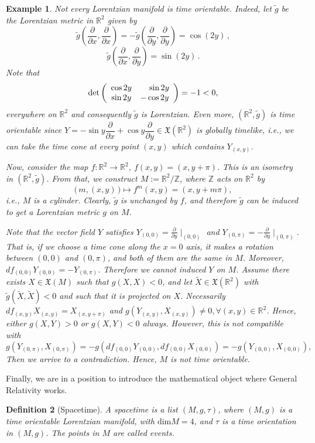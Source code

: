\documentclass[11pt]{book}
\newtheorem{defi}{Definition}[chapter]
\newtheorem{ex}[defi]{Example}
\def\R{\mathbb R}
\def\Z{\mathbb Z}
\def\x{\mathfrak X}
\begin{document}
\begin{ex}
	{\rm 
		Not every Lorentzian manifold is time orientable. 
		Indeed, let $\tilde{g}$ be the Lorentzian metric in $\R^2$ given by
		\[
		\tilde{g}\left(\frac{\partial}{\partial x}, \frac{\partial}{\partial x}\right)=-\tilde{g}\left(\frac{\partial}{\partial y}, \frac{\partial}{\partial y}\right)=\cos(2y)\,,
		\]
		\[
		\tilde{g}\left(\frac{\partial}{\partial x},\frac{\partial}{\partial y}\right)=\sin(2y)\,.
		\]
		Note that
		\[
		\mathrm{det}\left( \begin{array}{cc}
			\cos 2y & \hspace*{4mm}\sin 2y  \\
			\sin 2y & -\cos 2y
		\end{array} \right)=-1<0,
		\]
		everywhere on $\R^2$ and consequently $\tilde{g}$ is Lorentzian. Even more, $(\R^2,\tilde{g})$ is time orientable since $Y=-\sin y\dfrac{\partial}{\partial x} + \cos y \dfrac{\partial}{\partial y}\in \x(\R^2)$ is globally timelike, i.e., we can take the time cone at every point $(x,y)$ which contains $Y_{(x,y)}$.
		
		Now, consider the map $f : \R^2 \longrightarrow \R^2$, $f(x,y)=(x,y+\pi)$. This is an isometry in $(\R^2,\tilde{g})$. From that, we construct $M:=\R^2 / \Z$, where $\Z$ acts on $\R^2$ by
		$$\big(\,m,(x,y)\,\big) \mapsto f^m(x,y)=(x,y+m\pi),$$
		i.e., $M$ is a cylinder. Clearly, $\tilde{g}$ is unchanged by $f$, and therefore $\tilde{g}$ can be induced to get a Lorentzian metric $g$ on $M$. 
		
		Note that the vector field $Y$ satisfies $Y_{(0,0)}=\frac{\partial}{\partial y}\mid_{(0,0)}$ and $Y_{(0,\pi)}=-\frac{\partial}{\partial y}\mid_{(0,\pi)}$. That is, if we choose a time cone along the $x=0$ axis, it makes a rotation between $(0,0)$ and $(0,\pi)$, and both of them are the same in $M$. Moreover, $df_{(0,0)}Y_{(0,0)}=-Y_{(0,\pi)}$. Therefore we cannot induced $Y$ on $M$. Assume there exists $X\in \x(M)$ such that $g(X,X)<0$, and let $\tilde{X}\in \x(\R^2)$ with $\tilde{g}(\tilde{X},\tilde{X})<0$ and such that it is projected on $X$. Necessarily $df_{(x,y)}X_{(x,y)}=X_{(x,y+\pi)}$ and $g(Y_{(x,y)},X_{(x,y)})\ne 0, \forall(x,y)\in \R^2$. Hence, either $g(X,Y)>0$ or $g(X,Y)<0$ always. However, this is not compatible with 
		\[
		g(Y_{(0,\pi)},X_{(0,\pi)})=-g(df_{(0,0)}Y_{(0,0)}, df_{(0,0)}X_{(0,0)})=-g(Y_{(0,0)}, X_{(0,0)}),
		\]
		Then we arrive to a contradiction. Hence, $M$ is not time orientable.
	}
\end{ex}

Finally, we are in a position to introduce the mathematical object where General Relativity works.
\begin{defi}[Spacetime]
	A spacetime is a list $(M,g,\tau)$, where $(M,g)$ is a  time orientable Lorentzian manifold, with $\text{dim}M=4$, and $\tau$ is a time orientation in $(M,g)$. The points in $M$ are called events.
\end{defi}
\end{document}
